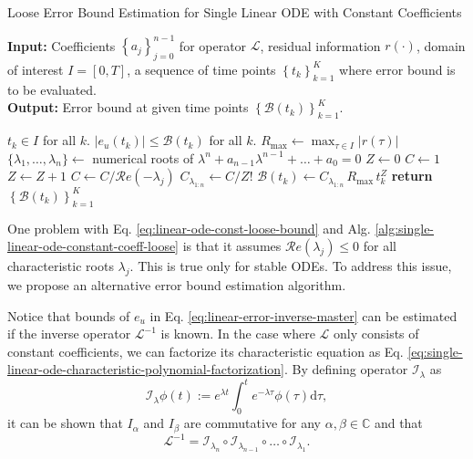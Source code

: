 \documentclass{article}
\newcommand{\Err}{e}
\newcommand{\Bound}{\mathcal{B}}
\renewcommand{\L}{\mathcal{L}}
\newcommand{\I}{\mathcal{I}}
\renewcommand{\Re}[1]{\mathcal{R}e\left(#1\right)}
\begin{document}
    \begin{algorithm}
        \caption{Loose Error Bound Estimation for Single Linear ODE with Constant Coefficients}\label{alg:single-linear-ode-constant-coeff-loose}
        \textbf{Input:} Coefficients $\left\{a_j\right\}_{j=0}^{n-1}$ for operator $\L$, residual information $r(\cdot)$, domain of interest $I = [0, T]$, a sequence of time points $\left\{t_k\right\}_{k=1}^{K}$ where error bound is to be evaluated.\\
        \textbf{Output:} Error bound at given time points $\left\{\Bound(t_k)\right\}_{k=1}^{K}$.

        \begin{algorithmic}
            \Require $t_k \in I$ for all $k$.
            \Ensure $\left|\Err_u(t_k)\right| \leq \Bound(t_k)$ for all $k$. 
            \vspace{0.5em}
            \State $\displaystyle R_{\max} \gets \max_{\tau \in I} |r(\tau)|$ 
            \State $\{\lambda_1, \dots, \lambda_n\} \gets$ numerical roots of $\lambda^n+a_{n-1}\lambda^{n-1}+\dots+a_0=0$ 
            \State $Z \gets 0$
            \State $C \gets 1$
                \If{$\Re{\lambda_j} = 0$}
                    \State $Z \gets Z + 1$
                \Else
                    \State $C \gets C / \Re{-\lambda_j}$
                \EndIf
            \EndFor
            \State $C_{\lambda_{1:n}}\gets C / Z!$
            \State $\Bound(t_k) \gets C_{\lambda_{1:n}}\, R_{\max}\, t_k^{Z} $
            \EndFor
            \State \textbf{return} $\left\{\Bound(t_k)\right\}_{k=1}^{K}$
        \end{algorithmic}
    \end{algorithm}

    One problem with Eq. \ref{eq:linear-ode-const-loose-bound} and Alg. \ref{alg:single-linear-ode-constant-coeff-loose} is that it assumes $\Re{\lambda_j} \leq 0$ for all characteristic roots $\lambda_j$. 
    This is true only for stable ODEs. 
    To address this issue, we propose an alternative error bound estimation algorithm.

    Notice that bounds of $\Err_u$ in Eq. \ref{eq:linear-error-inverse-master} can be estimated if the inverse operator $\L^{-1}$ is known. 
    In the case where $\L$ only consists of constant coefficients, we can factorize its characteristic equation as Eq. \ref{eq:single-linear-ode-characteristic-polynomial-factorization}.
    By defining operator $\I_{\lambda}$ as 
    \begin{equation}
        \I_\lambda \phi(t) := e^{{\lambda} t} \int_{0}^{t} e^{-{\lambda} \tau} \phi(\tau) \mathrm{d}\tau,
    \end{equation}
    it can be shown that $I_\alpha$ and $I_\beta$ are commutative for any $\alpha, \beta \in \mathbb{C}$ and that
    \begin{equation}
        \L^{-1} = \I_{\lambda_{n}} \circ \I_{\lambda_{n-1}} \circ \dots \circ \I_{\lambda_1}.
    \end{equation}
    
\end{document}

